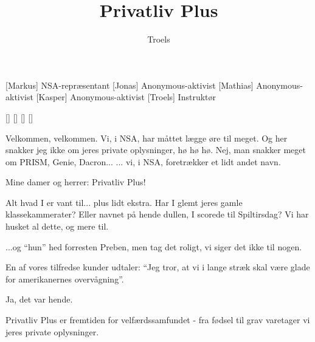 \documentclass[a4paper,11pt]{article}
\title{Privatliv Plus}
\author{Troels}
\begin{document}
\maketitle

\begin{roles}
[Markus] NSA-repræsentant
[Jonas] Anonymous-aktivist
[Mathias] Anonymous-aktivist
[Kasper] Anonymous-aktivist
[Troels] Instruktør
\end{roles}

\begin{props}
[]
[]
[]
[]
\end{props}

\begin{sketch}


   Velkommen, velkommen.  Vi, i NSA, har måttet lægge øre til
  meget.  Og her snakker jeg ikke om jeres private oplysninger, hø hø
  hø.   Nej, man snakker meget om
  PRISM, Genie, Dacron... ... vi, i NSA,
  foretrækker et lidt andet navn.


 Mine damer og herrer: Privatliv Plus!


 Alt hvad I er vant til... plus lidt ekstra.  Har I glemt
jeres gamle klassekammerater?  Eller navnet på hende dullen, I scorede
til Spiltirsdag?  Vi har husket al dette, og mere til.

 ...og "`hun"' hed forresten Preben, men tag det roligt, vi
siger det ikke til nogen.

 En af vores tilfredse kunder udtaler: "`Jeg tror, at vi i
lange stræk skal være glade for amerikanernes overvågning"'.


 Ja, det var hende.

 Privatliv Plus er fremtiden for velfærdssamfundet - fra
fødsel til grav varetager vi jeres private oplysninger.



\end{sketch}
\end{document}
